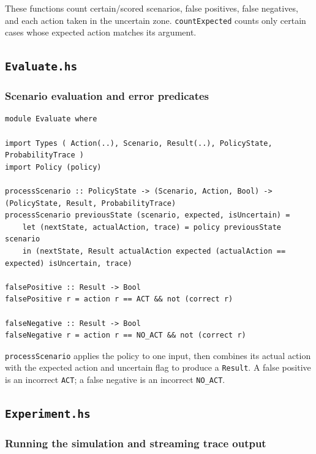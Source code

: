 \documentclass[11pt]{article}
\begin{document}
These functions count certain/scored scenarios, false positives, false
negatives, and each action taken in the uncertain zone. \texttt{countExpected}
counts only certain cases whose expected action matches its argument.

\subsection{\texttt{Evaluate.hs}}

\subsubsection{Scenario evaluation and error predicates}

\begin{lstlisting}
module Evaluate where

import Types ( Action(..), Scenario, Result(..), PolicyState, ProbabilityTrace )
import Policy (policy)

processScenario :: PolicyState -> (Scenario, Action, Bool) -> (PolicyState, Result, ProbabilityTrace)
processScenario previousState (scenario, expected, isUncertain) =
    let (nextState, actualAction, trace) = policy previousState scenario
    in (nextState, Result actualAction expected (actualAction == expected) isUncertain, trace)

falsePositive :: Result -> Bool
falsePositive r = action r == ACT && not (correct r)

falseNegative :: Result -> Bool
falseNegative r = action r == NO_ACT && not (correct r)
\end{lstlisting}

\texttt{processScenario} applies the policy to one input, then combines its
actual action with the expected action and uncertain flag to produce a
\texttt{Result}. A false positive is an incorrect \texttt{ACT}; a false
negative is an incorrect \texttt{NO\_ACT}.

\subsection{\texttt{Experiment.hs}}

\subsubsection{Running the simulation and streaming trace output}
\end{document}
